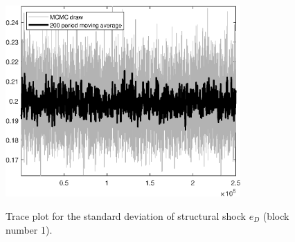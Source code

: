 \begin{figure}[H]
\centering
  \includegraphics[width=0.8\textwidth]{BRS_growth_ext_comovement/graphs/TracePlot_SE_e_D_blck_1}\\
    \caption{Trace plot for the standard deviation of structural shock ${e_D}$ (block number 1).}
\end{figure}
